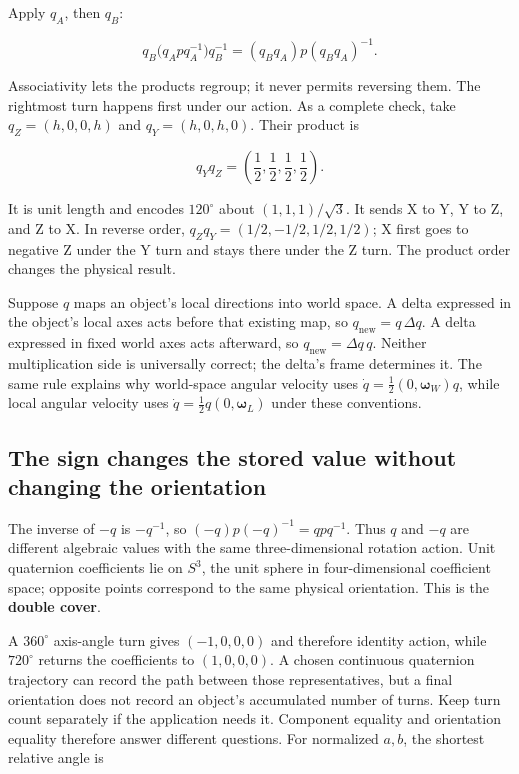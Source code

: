 Apply \(q_A\), then \(q_B\):

\[
q_B\bigl(q_Apq_A^{-1}\bigr)q_B^{-1}
=(q_Bq_A)p(q_Bq_A)^{-1}.
\]

Associativity lets the products regroup; it never permits reversing them. The rightmost turn happens first under our action. As a complete check, take \(q_Z=(h,0,0,h)\) and \(q_Y=(h,0,h,0)\). Their product is

\[
q_Yq_Z=\left(\frac12,\frac12,\frac12,\frac12\right).
\]

It is unit length and encodes \(120^\circ\) about \((1,1,1)/\sqrt3\). It sends X to Y, Y to Z, and Z to X. In reverse order, \(q_Zq_Y=(1/2,-1/2,1/2,1/2)\); X first goes to negative Z under the Y turn and stays there under the Z turn. The product order changes the physical result.

Suppose \(q\) maps an object's local directions into world space. A delta expressed in the object's local axes acts before that existing map, so \(q_{\mathrm{new}}=q\,\Delta q\). A delta expressed in fixed world axes acts afterward, so \(q_{\mathrm{new}}=\Delta q\,q\). Neither multiplication side is universally correct; the delta's frame determines it. The same rule explains why world-space angular velocity uses \(\dot q=\tfrac12(0,\boldsymbol\omega_W)q\), while local angular velocity uses \(\dot q=\tfrac12q(0,\boldsymbol\omega_L)\) under these conventions.

\subsection{The sign changes the stored value without changing the orientation}\label{01-foundations-i-ch019-the-sign-changes-the-stored-value-without-changing-the-orientation}

\hypertarget{01-foundations-i-ch019-the-sign-changes-the-stored-value-without-changing-the-orientation}{}

The inverse of \(-q\) is \(-q^{-1}\), so \((-q)p(-q)^{-1}=qpq^{-1}\). Thus \(q\) and \(-q\) are different algebraic values with the same three-dimensional rotation action. Unit quaternion coefficients lie on \(S^3\), the unit sphere in four-dimensional coefficient space; opposite points correspond to the same physical orientation. This is the \textbf{double cover}.

A \(360^\circ\) axis-angle turn gives \((-1,0,0,0)\) and therefore identity action, while \(720^\circ\) returns the coefficients to \((1,0,0,0)\). A chosen continuous quaternion trajectory can record the path between those representatives, but a final orientation does not record an object's accumulated number of turns. Keep turn count separately if the application needs it. Component equality and orientation equality therefore answer different questions. For normalized \(a,b\), the shortest relative angle is

